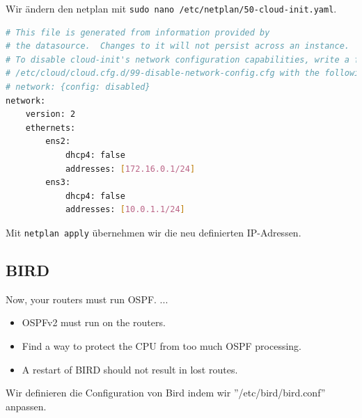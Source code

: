 \documentclass[11pt,titlepage]{article}
\newenvironment{shadedquotation}
 {\begin{shaded*}
  \quoting[leftmargin=0pt, vskip=0pt]
 }
 {\endquoting
 \end{shaded*}
}
\begin{document}
Wir ändern den netplan mit \lstinline{sudo nano /etc/netplan/50-cloud-init.yaml}.
\begin{lstlisting}[language=bash,caption={/etc/netplan/50-cloud-init.yaml on R1}]
# This file is generated from information provided by
# the datasource.  Changes to it will not persist across an instance.
# To disable cloud-init's network configuration capabilities, write a file
# /etc/cloud/cloud.cfg.d/99-disable-network-config.cfg with the following:
# network: {config: disabled}
network:
    version: 2
    ethernets:
        ens2:
            dhcp4: false
            addresses: [172.16.0.1/24]
        ens3:
        	dhcp4: false
        	addresses: [10.0.1.1/24]
\end{lstlisting}

Mit \lstinline{netplan apply} übernehmen wir die neu definierten IP-Adressen.

\subsection{BIRD}
\label{subsec:BIRD}
\begin{shadedquotation}
  Now, your routers must run OSPF. ...
  \begin{itemize}
    \item OSPFv2 must run on the routers.
    \item Find a way to protect the CPU from too much OSPF processing.
    \item A restart of BIRD should not result in lost routes.
  \end{itemize}
\end{shadedquotation}

Wir definieren die Configuration von Bird indem wir ''/etc/bird/bird.conf'' anpassen.
\end{document}
